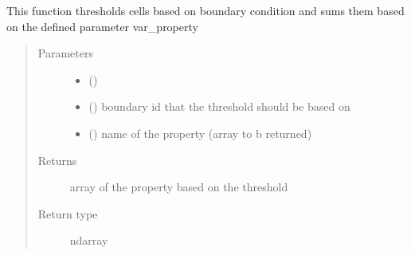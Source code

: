 \documentclass[letterpaper,10pt,english]{sphinxmanual}
\begin{document}
\begin{fulllineitems}
\begin{fulllineitems}
\end{fulllineitems}


\begin{fulllineitems}
\label{\detokenize{openfdem:openfdem.openfdem.Model.platen_info}}
This function thresholds cells based on boundary condition and sums them based on the defined parameter var\_property
\begin{quote}\begin{description}
\item[{Parameters}] \leavevmode\begin{itemize}
\item {} 
 () \textendash{} 

\item {} 
 () \textendash{} boundary id that the threshold should be based on

\item {} 
 () \textendash{} name of the property (array to b returned)

\end{itemize}

\item[{Returns}] \leavevmode
array of the property based on the threshold

\item[{Return type}] \leavevmode
ndarray

\end{description}\end{quote}

\end{fulllineitems}



\end{fulllineitems}
\end{document}
